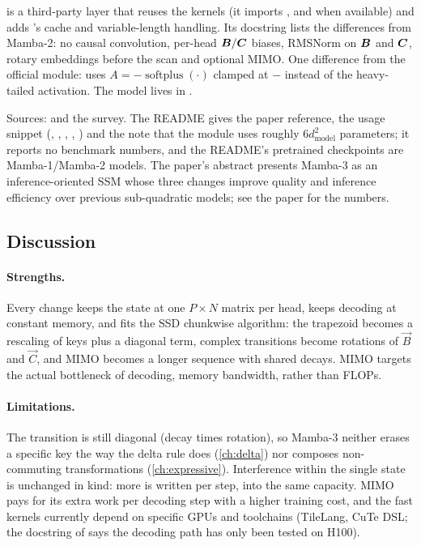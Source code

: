 \begin{implnote}[title={In the code: the \fla{} wrapper}]
 is a third-party layer
that reuses the  kernels (it imports ,
 and  when available) and adds \fla's cache and
variable-length handling. Its docstring lists the differences from Mamba-2: no causal
convolution, per-head $\bm{B}/\bm{C}$ biases, RMSNorm on $\bm{B}$ and $\bm{C}$, rotary embeddings before
the scan and optional MIMO. One difference from the official module:  uses
$A = -\operatorname{softplus}(\cdot)$ clamped at $-$ instead of the heavy-tailed
activation. The model lives in .
\end{implnote}

\begin{results}
Sources:  and the survey. The README gives the
paper reference, the usage snippet (, , ,
, ) and the note that the module uses roughly
$6d_{\mathrm{model}}^2$ parameters; it reports no benchmark numbers, and the README's
pretrained checkpoints are Mamba-1/Mamba-2 models. The paper's abstract presents Mamba-3 as an
inference-oriented SSM whose three changes improve quality and inference efficiency over
previous sub-quadratic models; see the paper for the numbers.
\end{results}

\subsection{Discussion}

\paragraph{Strengths.} Every change keeps the state at one $P\times N$ matrix per head, keeps
decoding at constant memory, and fits the SSD chunkwise algorithm: the trapezoid becomes a
rescaling of keys plus a diagonal term, complex transitions become rotations of $\vec B$ and
$\vec C$, and MIMO becomes a longer sequence with shared decays. MIMO targets the actual
bottleneck of decoding, memory bandwidth, rather than FLOPs.

\paragraph{Limitations.} The transition is still diagonal (decay times rotation), so
Mamba-3 neither erases a specific key the way the delta rule does (\cref{ch:delta}) nor
composes non-commuting transformations (\cref{ch:expressive}). Interference within the single
state is unchanged in kind: more is written per step, into the same capacity. MIMO pays for
its extra work per decoding step with a higher training cost, and the fast kernels currently
depend on specific GPUs and toolchains (TileLang, CuTe DSL; the docstring of
 says the decoding path has only been tested on H100).

